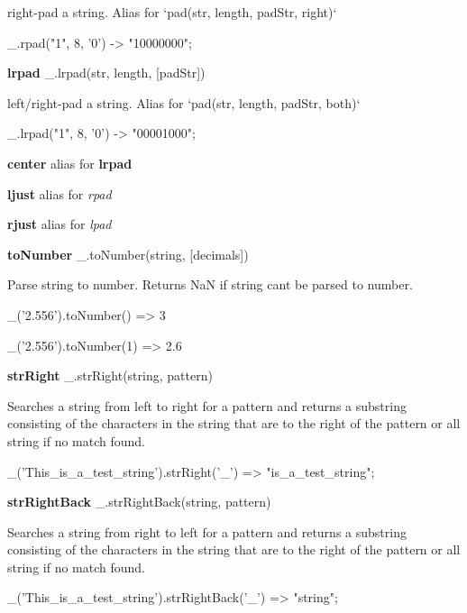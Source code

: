 right-\/pad a string. Alias for `pad(str, length, pad\+Str, \textquotesingle{}right\textquotesingle{})`


\begin{DoxyCode}
\_.rpad("1", 8, '0')
-> "10000000";
\end{DoxyCode}


{\bfseries lrpad} \+\_\+.\+lrpad(str, length, \mbox{[}pad\+Str\mbox{]})

left/right-\/pad a string. Alias for `pad(str, length, pad\+Str, \textquotesingle{}both\textquotesingle{})`


\begin{DoxyCode}
\_.lrpad("1", 8, '0')
-> "00001000";
\end{DoxyCode}


{\bfseries center} alias for {\bfseries lrpad}

{\bfseries ljust} alias for {\itshape rpad}

{\bfseries rjust} alias for {\itshape lpad}

{\bfseries to\+Number} \+\_\+.\+to\+Number(string, \mbox{[}decimals\mbox{]})

Parse string to number. Returns NaN if string can\textquotesingle{}t be parsed to number.


\begin{DoxyCode}
\_('2.556').toNumber()
=> 3

\_('2.556').toNumber(1)
=> 2.6
\end{DoxyCode}


{\bfseries str\+Right} \+\_\+.\+str\+Right(string, pattern)

Searches a string from left to right for a pattern and returns a substring consisting of the characters in the string that are to the right of the pattern or all string if no match found.


\begin{DoxyCode}
\_('This\_is\_a\_test\_string').strRight('\_')
=> "is\_a\_test\_string";
\end{DoxyCode}


{\bfseries str\+Right\+Back} \+\_\+.\+str\+Right\+Back(string, pattern)

Searches a string from right to left for a pattern and returns a substring consisting of the characters in the string that are to the right of the pattern or all string if no match found.


\begin{DoxyCode}
\_('This\_is\_a\_test\_string').strRightBack('\_')
=> "string";
\end{DoxyCode}



